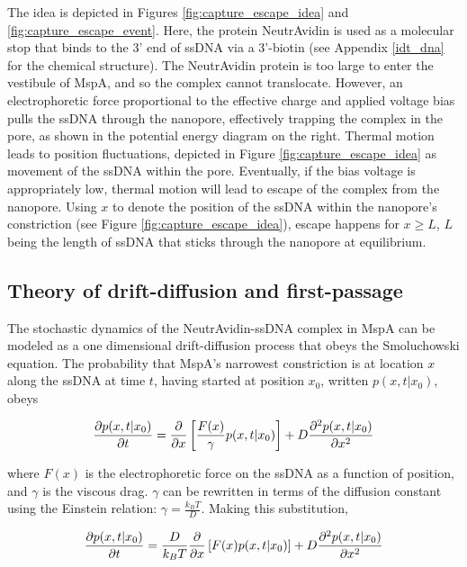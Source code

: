 The idea is depicted in Figures \ref{fig:capture_escape_idea} and \ref{fig:capture_escape_event}.  Here, the protein NeutrAvidin is used as a molecular stop that binds to the 3' end of ssDNA via a 3'-biotin (see Appendix \ref{idt_dna} for the chemical structure).  The NeutrAvidin protein is too large to enter the vestibule of MspA, and so the complex cannot translocate.  However, an electrophoretic force proportional to the effective charge and applied voltage bias pulls the ssDNA through the nanopore, effectively trapping the complex in the pore, as shown in the potential energy diagram on the right.  Thermal motion leads to position fluctuations, depicted in Figure \ref{fig:capture_escape_idea} as movement of the ssDNA within the pore.  Eventually, if the bias voltage is appropriately low, thermal motion will lead to escape of the complex from the nanopore.  Using $x$ to denote the position of the ssDNA within the nanopore's constriction (see Figure \ref{fig:capture_escape_idea}), escape happens for $x \geq L$, $L$ being the length of ssDNA that sticks through the nanopore at equilibrium.

\subsection{Theory of drift-diffusion and first-passage}

The stochastic dynamics of the NeutrAvidin-ssDNA complex in MspA can be modeled as a one dimensional drift-diffusion process that obeys the Smoluchowski equation.  The probability that MspA's narrowest constriction is at location $x$ along the ssDNA at time $t$, having started at position $x_0$, written $p(x,t|x_0)$, obeys

\begin{equation}
\frac{\partial p(x,t|x_0)}{\partial t} = \frac{\partial}{\partial x} \left[ \frac{F(x)}{\gamma} p(x,t|x_0) \right] + D \frac{\partial^2 p(x,t|x_0)}{\partial x^2}
\label{eqn:drift_diffusion}
\end{equation}

\noindent
where $F(x)$ is the electrophoretic force on the ssDNA as a function of position, and $\gamma$ is the viscous drag.  $\gamma$ can be rewritten in terms of the diffusion constant using the Einstein relation: $\gamma = \frac{k_B T}{D}$.  Making this substitution,

\begin{equation}
\frac{\partial p(x,t|x_0)}{\partial t} = \frac{D}{k_B T} \frac{\partial}{\partial x} \left[ F(x) p(x,t|x_0) \right] + D \frac{\partial^2 p(x,t|x_0)}{\partial x^2}
\label{eqn:drift_diffusion2}
\end{equation}

